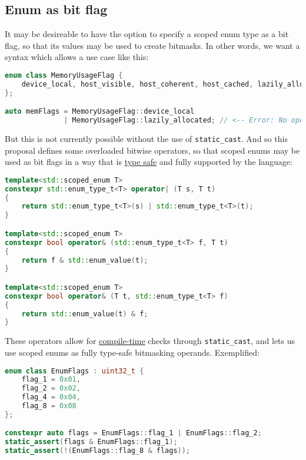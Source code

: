 \documentclass[
  format=manuscript,
  screen=true,
  review=false,
  nonacm=true,
  timestamp=true,
  balance=false]{acmart}
\begin{document}
\subsection{Enum as bit flag}

It may be desireable to have the option to specify a scoped enum type as a bit flag,
so that its values may be used to create bitmasks. In other words, we want a syntax
which allows a use case like this:\vspace{2mm}

\begin{lstlisting}[language=Cpp]
enum class MemoryUsageFlag {
    device_local, host_visible, host_coherent, host_cached, lazily_allocated, is_protected
};

auto memFlags = MemoryUsageFlag::device_local
              | MemoryUsageFlag::lazily_allocated; // <-- Error: No operator defined.
\end{lstlisting}

\noindent
But this is not currently possible without the use of \texttt{static\_cast}. And so
this proposal defines some overloaded bitwise operators, so that scoped enums may be
used as bit flags in a way that is \underline{type safe} and fully supported by the
language:\vspace{2mm}

\begin{lstlisting}[language=Cpp]
template<std::scoped_enum T>
constexpr std::enum_type_t<T> operator| (T s, T t)
{
    return std::enum_type_t<T>(s) | std::enum_type_t<T>(t);
}

template<std::scoped_enum T>
constexpr bool operator& (std::enum_type_t<T> f, T t)
{
    return f & std::enum_value(t);
}

template<std::scoped_enum T>
constexpr bool operator& (T t, std::enum_type_t<T> f)
{
    return std::enum_value(t) & f;
}
\end{lstlisting}

\noindent
These operators allow for \underline{compile-time} checks through \texttt{static\_cast},
and lets us use scoped enums as fully type-safe bitmasking operands. Exemplified:\vspace{2mm}

\begin{lstlisting}[language=Cpp]
enum class EnumFlags : uint32_t {
    flag_1 = 0x01,
    flag_2 = 0x02,
    flag_4 = 0x04,
    flag_8 = 0x08
};

constexpr auto flags = EnumFlags::flag_1 | EnumFlags::flag_2;
static_assert(flags & EnumFlags::flag_1);
static_assert(!(EnumFlags::flag_8 & flags));
\end{lstlisting}
\end{document}
